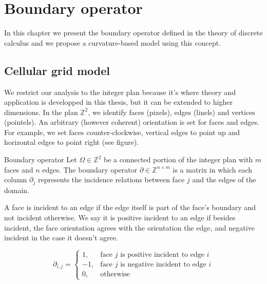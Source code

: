 \chapter{Boundary operator}
\label{chapter:boundary-operator}

In this chapter we present the boundary operator defined in the theory of discrete calculus and we propose a curvature-based model using this concept.

\section{Cellular grid model}

We restrict our analysis to the integer plan because it's where theory and application is developped in this thesis, but it can be extended to higher dimensions. In the plan $\mathbb{Z}^2$, we identify faces (pixels), edges (linels) and vertices (pointels). An arbitrary (however coherent) orientation is set for faces and edges. For example, we set faces counter-clockwise, vertical edges to point up and horizontal edges to point right (see figure).

\begin{definition}{Boundary operator}
	Let $\Omega \in \mathbb{Z}^2$ be a connected portion of the integer plan with $m$ faces and $n$ edges. The boundary operator $\partial \in \mathbb{Z}^{n \times m}$ is a matrix in which each column $\partial _j$ represents the incidence relations between face $j$ and the edges of the domain.
\end{definition}

A face is incident to an edge if the edge itself is part of the face's boundary and not incident otherwise. We say it is positive incident to an edge if besides incident, the face orientation  agrees with the orientation the edge, and negative incident in the case it doesn't agree.

\[
\partial _{i,j} = \left\{ \begin{array}{ll}
	1, & \text{face $j$ is positive incident to edge $i$}\\
	-1, & \text{face $j$ is negative incident to edge $i$}\\	
	0, & \text{otherwise}
\end{array}\right.
\]

